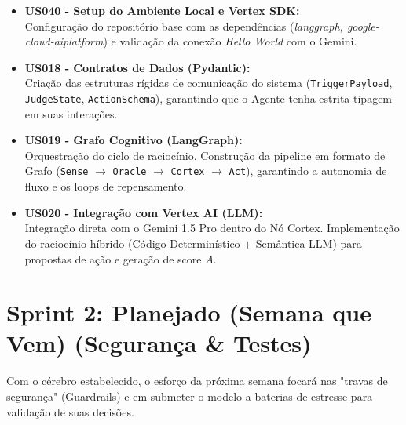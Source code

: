 \documentclass[11pt,a4paper]{article}
\begin{document}
\begin{itemize}[label={\color{green}\textbf{\checkmark}}, leftmargin=*]
    \setlength\itemsep{0.5em}
    
    \item \textbf{US040 - Setup do Ambiente Local e Vertex SDK:}\\
    Configuração do repositório base com as dependências (\textit{langgraph, google-cloud-aiplatform}) e validação da conexão \textit{Hello World} com o Gemini.
    
    \item \textbf{US018 - Contratos de Dados (Pydantic):}\\
    Criação das estruturas rígidas de comunicação do sistema (\texttt{TriggerPayload}, \texttt{JudgeState}, \texttt{ActionSchema}), garantindo que o Agente tenha estrita tipagem em suas interações.
    
    \item \textbf{US019 - Grafo Cognitivo (LangGraph):}\\
    Orquestração do ciclo de raciocínio. Construção da pipeline em formato de Grafo (\texttt{Sense} $\rightarrow$ \texttt{Oracle} $\rightarrow$ \texttt{Cortex} $\rightarrow$ \texttt{Act}), garantindo a autonomia de fluxo e os loops de repensamento.
    
    \item \textbf{US020 - Integração com Vertex AI (LLM):}\\
    Integração direta com o Gemini 1.5 Pro dentro do Nó Cortex. Implementação do raciocínio híbrido (Código Determinístico + Semântica LLM) para propostas de ação e geração de score $A$.
\end{itemize}

\vspace{0.5cm}

\section{Sprint 2: Planejado (Semana que Vem) (Segurança \& Testes)}
Com o cérebro estabelecido, o esforço da próxima semana focará nas "travas de segurança" (Guardrails) e em submeter o modelo a baterias de estresse para validação de suas decisões.
\end{document}
